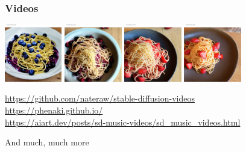 \documentclass[17pt,aspectratio=169,hyperref={pdfusetitle,colorlinks,allcolors=olive}]{beamer}
\begin{document}
\begin{frame}[fragile]
  \frametitle{Videos}

  \begin{center}
    \includegraphics[width=2.5cm]{figs/sd-video-1}
    \includegraphics[width=2.5cm]{figs/sd-video-2}
    \includegraphics[width=2.5cm]{figs/sd-video-3}
    \includegraphics[width=2.5cm]{figs/sd-video-4}
  \end{center}
  
  \begin{flushright}
    {\scriptsize
      \url{https://github.com/nateraw/stable-diffusion-videos} \\
      \url{https://phenaki.github.io/} \\
      \url{https://aiart.dev/posts/sd-music-videos/sd_music_videos.html} \\
    }
  \end{flushright}
  
  
\end{frame}

\begin{frame}[fragile]

  \begin{center}
    {\Large And much, much more}
  \end{center}
    
\end{frame}
\end{document}
